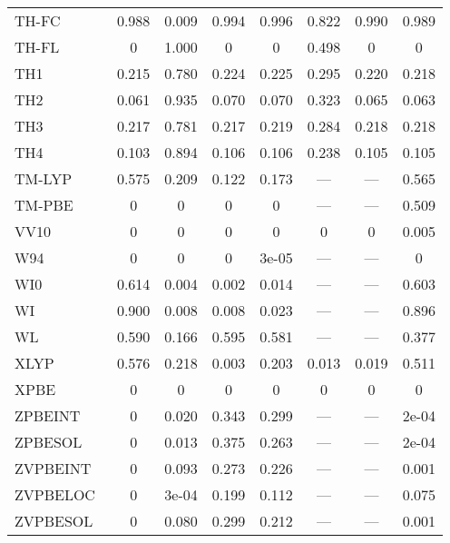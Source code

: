 \begin{table*}
\begin{tabular}{|l|c|c|c|c|c|c|c|}
TH-FC~\cite{Tozer1997_183} & 0.988 & 0.009 & 0.994 & 0.996 & 0.822 & 0.990 & 0.989 \\
TH-FL~\cite{Tozer1997_183} & 0 & 1.000 & 0 & 0 & 0.498 & 0 & 0 \\
TH1~\cite{Tozer1998_2545} & 0.215 & 0.780 & 0.224 & 0.225 & 0.295 & 0.220 & 0.218 \\
TH2~\cite{Tozer1998_3162} & 0.061 & 0.935 & 0.070 & 0.070 & 0.323 & 0.065 & 0.063 \\
TH3~\cite{Handy1998_707} & 0.217 & 0.781 & 0.217 & 0.219 & 0.284 & 0.218 & 0.218 \\
TH4~\cite{Handy1998_707} & 0.103 & 0.894 & 0.106 & 0.106 & 0.238 & 0.105 & 0.105 \\
TM-LYP~\cite{Thakkar2009_134109} & 0.575 & 0.209 & 0.122 & 0.173 & --- & --- & 0.565 \\
TM-PBE~\cite{Thakkar2009_134109} & 0 & 0 & 0 & 0 & --- & --- & 0.509 \\
VV10~\cite{Vydrov2010_244103} & 0 & 0 & 0 & 0 & 0 & 0 & 0.005 \\
W94~\cite{Wilson1994_337} & 0 & 0 & 0 & 3e-05 & --- & --- & 0 \\
WI0~\cite{Wilson1998_523} & 0.614 & 0.004 & 0.002 & 0.014 & --- & --- & 0.603 \\
WI~\cite{Wilson1998_523} & 0.900 & 0.008 & 0.008 & 0.023 & --- & --- & 0.896 \\
WL~\cite{Wilson1990_12930} & 0.590 & 0.166 & 0.595 & 0.581 & --- & --- & 0.377 \\
XLYP~\cite{Xu2004_2673} & 0.576 & 0.218 & 0.003 & 0.203 & 0.013 & 0.019 & 0.511 \\
XPBE~\cite{Xu2004_4068} & 0 & 0 & 0 & 0 & 0 & 0 & 0 \\
ZPBEINT~\cite{Constantin2011_233103} & 0 & 0.020 & 0.343 & 0.299 & --- & --- & 2e-04 \\
ZPBESOL~\cite{Constantin2011_233103} & 0 & 0.013 & 0.375 & 0.263 & --- & --- & 2e-04 \\
ZVPBEINT~\cite{Constantin2012_194105} & 0 & 0.093 & 0.273 & 0.226 & --- & --- & 0.001 \\
ZVPBELOC~\cite{Fabiano2015_122} & 0 & 3e-04 & 0.199 & 0.112 & --- & --- & 0.075 \\
ZVPBESOL~\cite{Constantin2012_194105} & 0 & 0.080 & 0.299 & 0.212 & --- & --- & 0.001 \\
\bottomrule
\end{tabular}
\end{table*}
